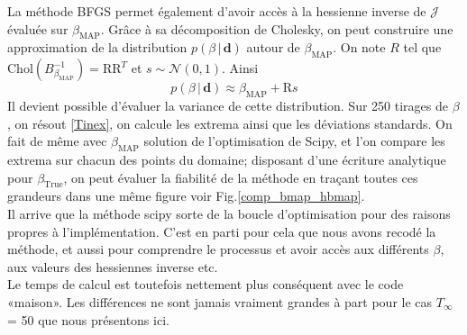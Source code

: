 \documentclass[a4paper,12pt]{article}
\newcommand{\bepar}[1]{
	\left( #1 \right)  
}
\newcommand{\bmap}{\beta_{\text{MAP}}}
\newcommand{\J}{\mathcal{J}}
\newcommand{\tinf}{$T_\infty$}
\numberwithin{equation}{section} %
\begin{document}
\noindent La méthode BFGS permet également d'avoir accès à la hessienne inverse de $\J$ évaluée sur $\bmap$. Grâce à sa décomposition de Cholesky, on peut construire une approximation de la distribution $p\bepar{\beta\,|\,\textbf{d}}$ autour de $\bmap$. 
On note $R$ tel que $\text{Chol}\bepar{B_{\bmap}^{-1}} = \text{R}\text{R}^T$ et $s \sim \mathcal{N}\bepar{0,1}$. Ainsi 
\begin{equation}
p\bepar{\beta\,|\,\textbf{d}} \approx \bmap + \text{R}s \label{distribbmap}
\end{equation}
Il devient possible d'évaluer la variance de cette distribution. Sur 250 tirages de $\beta$, on résout \eqref{Tinex}, on calcule les extrema ainsi que les déviations standards. On fait de même avec $\bmap$ solution de l'optimisation de Scipy, et l'on compare les extrema sur chacun des points du domaine; disposant d'une écriture analytique pour $\beta_{\text{True}}$, on peut évaluer la fiabilité de la méthode en traçant toutes ces grandeurs dans une même figure voir Fig.\eqref{comp_bmap_hbmap}. \\
 Il arrive que la méthode scipy sorte de la boucle d'optimisation pour des raisons propres à l'implémentation. C'est en parti pour cela que nous avons recodé la méthode, et aussi pour comprendre le processus et avoir accès aux différents $\beta$, aux valeurs des hessiennes inverse etc.\\
 Le temps de calcul est toutefois nettement plus conséquent avec le code «maison». Les différences ne sont jamais vraiment grandes à part pour le cas \tinf = 50 que nous présentons ici. 

\pagebreak


\end{document}
